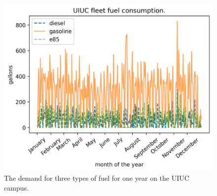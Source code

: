 \begin{figure}
  \centering
  \includegraphics[width=\textwidth]{uiuc_fueldemand}
  \caption{The demand for three types of fuel for one year on the UIUC campus.}
  \label{fig:fueldemand}
\end{figure}
